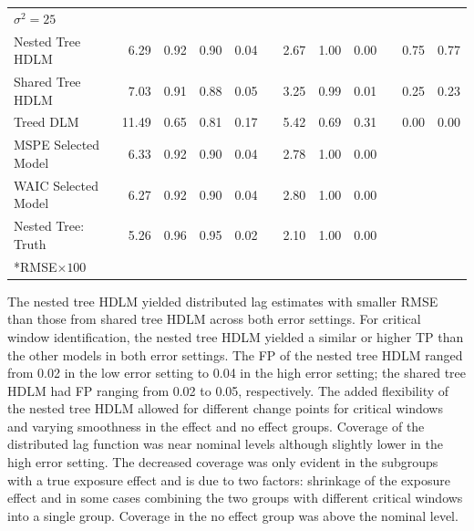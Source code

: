 \documentclass[12pt]{article}
\begin{document}
\begin{table}[!ht]
\begin{tabular}{lrrrrrrrrrcc}
        \multicolumn{9}{l}{$\sigma^2=25$}\\
        Nested Tree HDLM & 6.29 & 0.92 & 0.90 & 0.04 &  & 2.67 & 1.00 & 0.00 &  & 0.75 & 0.77\\
        Shared Tree HDLM & 7.03 & 0.91 & 0.88 & 0.05 &  & 3.25 & 0.99 & 0.01 &  & 0.25 & 0.23\\
              Treed DLM & 11.49 & 0.65 & 0.81 & 0.17 &  & 5.42 & 0.69 & 0.31 &  & 0.00 & 0.00\\
\addlinespace
MSPE Selected Model & 6.33 & 0.92 & 0.90 & 0.04 &  & 2.78 & 1.00 & 0.00 &   \\
WAIC Selected Model & 6.27 & 0.92 & 0.90 & 0.04 &  & 2.80 & 1.00 & 0.00 &  \\
\addlinespace
      Nested Tree: Truth & 5.26 & 0.96 & 0.95 & 0.02 &  & 2.10 & 1.00 & 0.00 & \\
        \bottomrule[2pt]
        \multicolumn{9}{l}{*RMSE$\times100$}\\
    \end{tabular}
\end{table}

The nested tree HDLM yielded distributed lag estimates with smaller RMSE than those from shared tree HDLM across both error settings. For critical window identification, the nested tree HDLM yielded a similar or higher TP than the other models in both error settings. The FP of the nested tree HDLM ranged from 0.02 in the low error setting to 0.04 in the high error setting; the shared tree HDLM had FP ranging from 0.02 to 0.05, respectively. The added flexibility of the nested tree HDLM allowed for different change points for critical windows and varying smoothness in the effect and no effect groups. Coverage of the distributed lag function was near nominal levels although slightly lower in the high error setting. The decreased coverage was only evident in the subgroups with a true exposure effect and is due to two factors: shrinkage of the exposure effect and in some cases combining the two groups with different critical windows into a single group.  Coverage in the no effect group was above the nominal level. 
\end{document}
